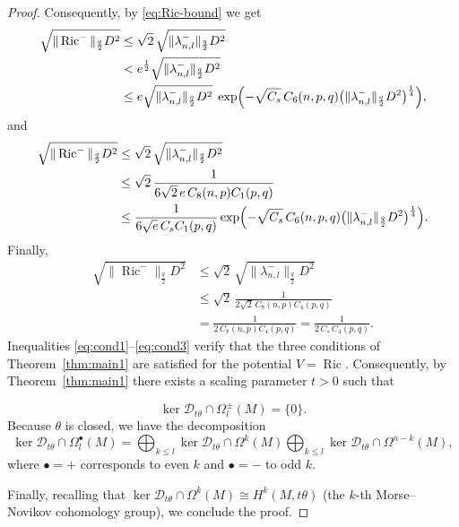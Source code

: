 \documentclass[12pt, twoside]{article}
\theoremstyle{definition}
\numberwithin{equation}{section}
\begin{document}
\begin{proof}
	Consequently, by \eqref{eq:Ric-bound} we get
	\begin{align}\label{eq:cond1}
	\sqrt{\|\operatorname{Ric}^{-}\|_{\frac{q}{2}}D^{2}}
	&\le \sqrt{2}\,\sqrt{\|\lambda^{-}_{n,l}\|_{\frac{q}{2}}D^{2}} \nonumber \\
	&< e^{\frac{1}{2}}\sqrt{\|\lambda^{-}_{n,l}\|_{\frac{q}{2}}D^{2}} \nonumber \\
	&\le e\sqrt{\|\lambda^{-}_{n,l}\|_{\frac{q}{2}}D^{2}}\;
	\exp\Bigl(-\sqrt{C_s}\,C_6(n,p,q)\bigl(\|\lambda^{-}_{n,l}\|_{\frac{q}{2}}D^{2}\bigr)^{\frac{1}{4}}\Bigr),
	\end{align}
	and
	\begin{align}\label{eq:cond2}
	\sqrt{\|\operatorname{Ric}^{-}\|_{\frac{q}{2}}D^{2}}
	&\le \sqrt{2}\,\sqrt{\|\lambda^{-}_{n,l}\|_{\frac{q}{2}}D^{2}} \nonumber \\
	&\le \sqrt{2}\,\frac{1}{6\sqrt{2}\,e\,C_{8}(n,p)C_{1}(p,q)} \nonumber \\
	&\le \frac{1}{6\sqrt{e}\,C_s C_{1}(p,q)}
	\exp\Bigl(-\sqrt{C_s}\,C_6(n,p,q)\bigl(\|\lambda^{-}_{n,l}\|_{\frac{q}{2}}D^{2}\bigr)^{\frac{1}{4}}\Bigr).
	\end{align}
	Finally,
	\begin{align}\label{eq:cond3}
	\sqrt{\|\operatorname{Ric}^{-}\|_{\frac{q}{2}}D^{2}}
	&\le \sqrt{2}\,\sqrt{\|\lambda^{-}_{n,l}\|_{\frac{q}{2}}D^{2}} \nonumber \\
	&\le \sqrt{2}\,\frac{1}{2\sqrt{2}\,C_{8}(n,p)C_{4}(p,q)} \nonumber \\
	&= \frac{1}{2\,C_{8}(n,p)C_{4}(p,q)} = \frac{1}{2\,C_s\,C_{4}(p,q)}.
	\end{align}
Inequalities \eqref{eq:cond1}--\eqref{eq:cond3} verify that the three conditions of Theorem~\ref{thm:main1} are satisfied for the potential \(V = \operatorname{Ric}\).  
Consequently, by Theorem~\ref{thm:main1} there exists a scaling parameter \(t>0\) such that  

\[
\ker\mathcal{D}_{t\theta} \cap \Omega^{\pm}_{l}(M) = \{0\}.
\]
Because \(\theta\) is closed, we have the decomposition  
\[
\ker\mathcal{D}_{t\theta} \cap \Omega^{\bullet}_{l}(M)
= \bigoplus_{k \le l} \ker\mathcal{D}_{t\theta} \cap \Omega^{k}(M)
\bigoplus_{k \le l} \ker\mathcal{D}_{t\theta} \cap \Omega^{n-k}(M),
\]
where \(\bullet = +\) corresponds to even \(k\) and \(\bullet = -\) to odd \(k\).  

Finally, recalling that \(\ker\mathcal{D}_{t\theta} \cap \Omega^{k}(M) \cong H^{k}(M,t\theta)\) (the \(k\)-th Morse--Novikov cohomology group), we conclude the proof.
\end{proof}
\end{document}
